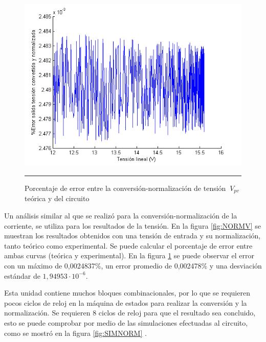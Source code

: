   \begin{figure}[H]
  \centering
    \includegraphics[scale=0.8]{./ERROR_CONV_NORM_V.png}
    \rule{35em}{0.5pt}
  \caption[Porcentaje de error entre la conversión-normalización de tensión $\ V_{pv}$ teórica y del circuito]{Porcentaje de error entre la conversión-normalización de tensión $\ V_{pv}$ teórica y del circuito}
  \label{fig:ENORMV}
\end{figure}

\newpage 

Un análisis similar al que se realizó para la conversión-normalización de la corriente, se utiliza para los resultados de la tensión. En la figura \ref{fig:NORMV} se muestran los resultados obtenidos con una tensión de entrada y su normalización, tanto teórico como experimental. Se puede calcular el porcentaje de error entre ambas curvas (teórica y experimental). En la figura \ref{fig:ENORMV} se puede observar el error con un máximo de 0,0024837\%, un error promedio de 0,002478\% y una desviación estándar de $ 1,94953 \cdot 10^{-6} $.

Esta unidad contiene muchos bloques combinacionales, por lo que se requieren pocos ciclos de reloj en la máquina de estados para realizar la conversión y la normalización. Se requieren 8 ciclos de reloj para que el resultado sea concluido, esto se puede comprobar por medio de las  simulaciones efectuadas al circuito, como se mostró en la  figura \ref{fig:SIMNORM} .
